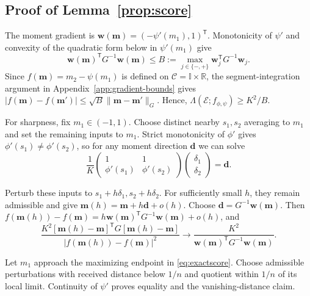 \documentclass[journal,12pt,onecolumn,draftclsnofoot]{IEEEtran}
\newcommand{\enc}{\mathscr{E}}\newcommand{\dec}{\mathscr{D}}\newcommand{\R}{\mathbb R}\newcommand{\C}{\mathbb C}
\newcommand{\T}{\mathsf T}\newcommand{\suc}{\succeq}
\begin{document}
\subsection{Proof of Lemma~\ref{prop:score}}\label{app:prof:score}


The moment gradient is $\boldsymbol w(\boldsymbol m)=(-\psi'(m_1),1)^\T$.
Monotonicity of $\psi'$ and convexity of the quadratic form below in $\psi'(m_1)$ give
$$
\boldsymbol w(\boldsymbol m)^\T G^{-1}\boldsymbol w(\boldsymbol m)
\le B:=\max_{j\in\{-,+\}}\boldsymbol w_j^\T G^{-1}\boldsymbol w_j.
$$
Since $f(\boldsymbol m)=m_2-\psi(m_1)$ is defined on
$\mathcal C=\mathbb I\times\R$, the segment-integration argument in
Appendix~\ref{app:gradient-bounds} gives
$|f(\boldsymbol m)-f(\boldsymbol m')|
\le\sqrt B\|\boldsymbol m-\boldsymbol m'\|_G$.
Hence, $\Lambda(\enc;f_{\phi,\psi})\ge K^2/B$.


For sharpness, fix $m_1\in(-1,1)$. Choose distinct nearby $s_1,s_2$ averaging to $m_1$ and set the remaining inputs to $m_1$.
Strict monotonicity of $\phi'$ gives $\phi'(s_1)\ne\phi'(s_2)$, so for any moment direction $\boldsymbol d$ we can solve
$$
\frac1K\begin{pmatrix}1&1\\\phi'(s_1)&\phi'(s_2)\end{pmatrix}
 \begin{pmatrix}\delta_1\\\delta_2\end{pmatrix}=\boldsymbol d.
$$

Perturb these inputs to $s_1+h\delta_1,s_2+h\delta_2$.
For sufficiently small $h$, they remain admissible and give
$\boldsymbol m(h)=\boldsymbol m+h\boldsymbol d+o(h)$.
Choose $\boldsymbol d=G^{-1}\boldsymbol w(\boldsymbol m)$.
Then $f(\boldsymbol m(h))-f(\boldsymbol m)
=h\boldsymbol w(\boldsymbol m)^\T G^{-1}\boldsymbol w(\boldsymbol m)+o(h)$, and
$$
\frac{K^2[\boldsymbol m(h)-\boldsymbol m]^\T G[\boldsymbol m(h)-\boldsymbol m]}
{|f(\boldsymbol m(h))-f(\boldsymbol m)|^2}
\longrightarrow
\frac{K^2}{\boldsymbol w(\boldsymbol m)^\T G^{-1}\boldsymbol w(\boldsymbol m)}.
$$

Let $m_1$ approach the maximizing endpoint in \eqref{eq:exactscore}.
Choose admissible perturbations with received distance below $1/n$ and quotient within $1/n$ of its local limit.
Continuity of $\psi'$ proves equality and the vanishing-distance claim.
\end{document}
